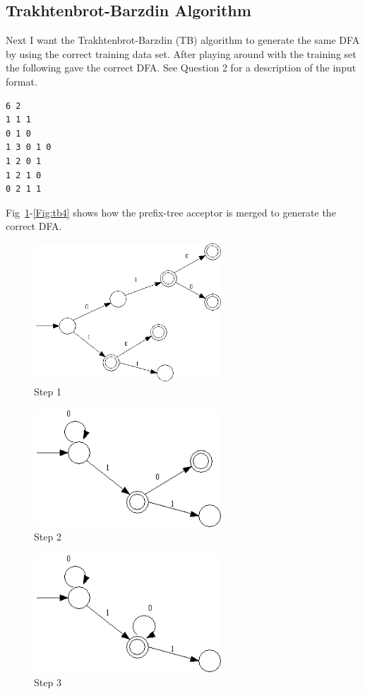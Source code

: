 \documentclass[a4paper,11pt,titlepage]{article}
\begin{document}
\subsection{Trakhtenbrot-Barzdin Algorithm}
Next I want the Trakhtenbrot-Barzdin (TB) algorithm to generate the same DFA by using the correct training data set. After playing around with the training set the following gave the correct DFA. See Question 2 for a description of the input format.
\begin{verbatim}
6 2
1 1 1
0 1 0
1 3 0 1 0
1 2 0 1
1 2 1 0
0 2 1 1
\end{verbatim}
Fig~\ref{Fig:tb1}-\ref{Fig:tb4} shows how the prefix-tree acceptor is merged to generate the correct DFA.

\begin{figure}[htbp]
   \centering
   \includegraphics[width=7cm]{tb1.png}
   \caption{Step 1}
   \label{Fig:tb1}
\end{figure}

\begin{figure}[htbp]
   \centering
   \includegraphics[width=7cm]{tb2.png}
   \caption{Step 2}
   \label{Fig:tb2}
\end{figure}

\begin{figure}[htbp]
   \centering
   \includegraphics[width=7cm]{tb3.png}
   \caption{Step 3}
   \label{Fig:tb3}
\end{figure}
\end{document}
